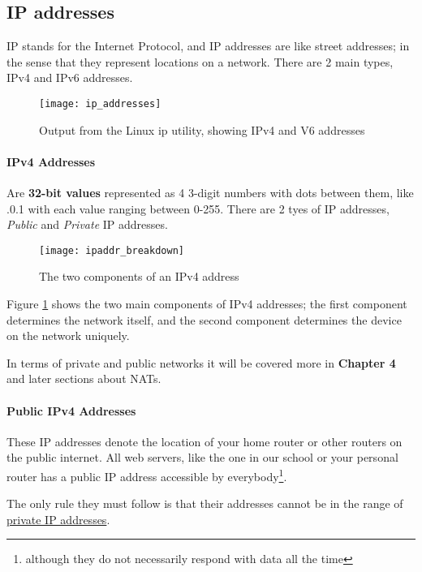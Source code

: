 \documentclass[../main.tex]{subfiles}
\begin{document}
\subsection{IP addresses}

IP stands for the Internet Protocol, and IP addresses are like street addresses; in the sense that they represent locations on a network. There are 2 main types, IPv4 and IPv6 addresses.

\begin{figure}[h]
    \centering
    \texttt{[image: ip\_addresses]}
    \caption{Output from the Linux {\ccmono ip} utility, showing IPv4 and V6 addresses}
\end{figure}

\paragraph{IPv4 Addresses}

Are \textbf{32-bit values} represented as 4 3-digit numbers with dots between them, like {.0.1} with each value ranging between 0-255. There are 2 tyes of IP addresses, \emph{Public} and \emph{Private} IP addresses.

\begin{figure}[h]
    \centering
    \texttt{[image: ipaddr\_breakdown]}
    \caption{The two components of an IPv4 address}
    \label{fig:ipaddr_breakdown}
\end{figure}

Figure \ref{fig:ipaddr_breakdown} shows the two main components of IPv4 addresses; the first component determines the network itself, and the second component determines the device on the network uniquely.

In terms of private and public networks it will be covered more in \textbf{Chapter 4} and later sections about NATs.

\paragraph{Public IPv4 Addresses}

These IP addresses denote the location of your home router or other routers on the public internet. All web servers, like the one in our school or your personal router has a public IP address accessible by everybody\footnote{although they do not necessarily respond with data all the time}.

The only rule they must follow is that their addresses cannot be in the range of \hyperref[tab:private_ip_classes]{private IP addresses}.
\end{document}
